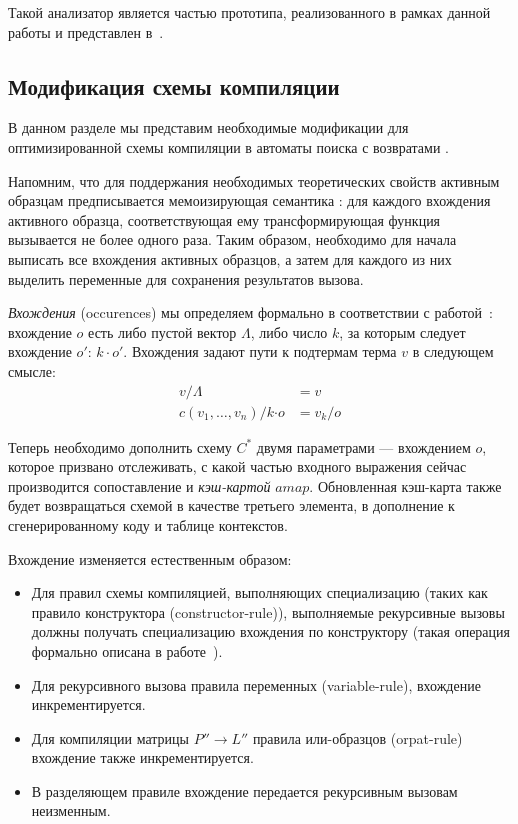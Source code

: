 Такой анализатор является частью прототипа, реализованного в рамках данной работы и представлен в~\cite{myrepo}.

\subsection{Модификация схемы компиляции}

В данном разделе мы представим необходимые модификации для оптимизированной схемы компиляции в автоматы поиска с возвратами \cite{fessant2001optimizing}.

Напомним, что для поддержания необходимых теоретических свойств активным образцам предписывается мемоизирующая семантика \cite{okasaki98views}: для каждого вхождения активного образца, соответствующая ему трансформирующая функция вызывается не более одного раза. Таким образом, необходимо для начала выписать все вхождения активных образцов, а затем для каждого из них выделить переменные для сохранения результатов вызова.

\textit{Вхождения} (occurences) мы определяем формально в соответствии с работой~\cite{maranget2008decisiontrees}: вхождение $o$ есть либо пустой вектор $\Lambda$, либо число $k$, за которым следует вхождение $o'$: $k \cdot o'$. Вхождения задают пути к подтермам терма $v$ в следующем смысле:
\begin{align*}
	v/\Lambda &= v  \\
	c(v_1,\ldots, v_n)/k \boldsymbol{\cdot} o &= v_k/o  
\end{align*}

Теперь необходимо дополнить схему $C^*$ двумя параметрами --- вхождением $o$, которое призвано отслеживать, с какой частью входного выражения сейчас производится сопоставление и \textit{кэш-картой} $amap$. Обновленная кэш-карта также будет возвращаться схемой в качестве третьего элемента, в дополнение к сгенерированному коду и таблице контекстов.

Вхождение изменяется естественным образом: 

\begin{itemize}
\item Для правил схемы компиляцией, выполняющих специализацию (таких как правило конструктора (constructor-rule)), выполняемые рекурсивные вызовы должны получать специализацию вхождения по конструктору (такая операция формально описана в работе~\cite{maranget2008decisiontrees}).
\item Для рекурсивного вызова правила переменных (variable-rule), вхождение инкрементируется.
\item Для компиляции матрицы $P'' \to L''$ правила или-образцов (orpat-rule)~\cite{fessant2001optimizing} вхождение также инкрементируется.
\item В разделяющем правиле вхождение передается рекурсивным вызовам неизменным.
\end{itemize}

